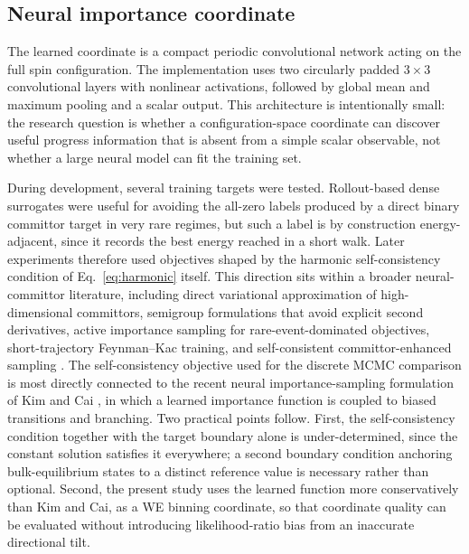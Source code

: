 \documentclass[a4paper,fleqn]{cas-sc}
\begin{document}
\subsection{Neural importance coordinate}\label{sec:neural}
The learned coordinate is a compact periodic convolutional network acting on the full spin
configuration. The implementation uses two circularly padded $3\times3$ convolutional layers
with nonlinear activations, followed by global mean and maximum pooling and a scalar output.
This architecture is intentionally small: the research question is whether a
configuration-space coordinate can discover useful progress information that is absent from a
simple scalar observable, not whether a large neural model can fit the training set.

During development, several training targets were tested. Rollout-based dense surrogates were
useful for avoiding the all-zero labels produced by a direct binary committor target in very
rare regimes, but such a label is by construction energy-adjacent, since it records the best
energy reached in a short walk. Later experiments therefore used objectives shaped by the
harmonic self-consistency condition of Eq.~\eqref{eq:harmonic} itself. This direction sits
within a broader neural-committor literature, including direct variational approximation of
high-dimensional committors, semigroup formulations that avoid explicit second derivatives,
active importance sampling for rare-event-dominated objectives, short-trajectory
Feynman--Kac training, and self-consistent committor-enhanced sampling
\citep{khoo2019,li2022,rotskoff2022,strahan2023,kang2024,trizio2025}. The self-consistency
objective used for the discrete MCMC comparison is most directly connected to the recent
neural importance-sampling formulation of Kim and Cai \citep{kimcai2026}, in which a learned
importance function is coupled to biased transitions and branching. Two practical points
follow. First, the self-consistency condition together with the target boundary alone is
under-determined, since the constant solution satisfies it everywhere; a second boundary
condition anchoring bulk-equilibrium states to a distinct reference value is necessary rather
than optional. Second, the present study uses the learned function more conservatively than
Kim and Cai, as a WE binning coordinate, so that coordinate quality can be evaluated without
introducing likelihood-ratio bias from an inaccurate directional tilt.
\end{document}
